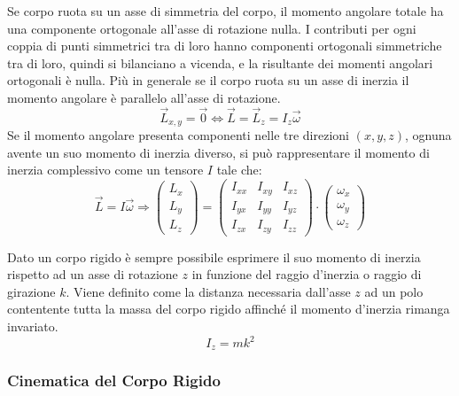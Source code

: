 \documentclass{article}
\numberwithin{equation}{subsection}
\begin{document}
Se corpo ruota su un asse di simmetria del corpo, il momento angolare totale ha una componente ortogonale all'asse di rotazione nulla. I contributi per ogni coppia di 
punti simmetrici tra di loro hanno componenti ortogonali simmetriche tra di loro, quindi si bilanciano a vicenda, e la risultante dei momenti angolari ortogonali è nulla. 
Più in generale se il corpo ruota su un asse di inerzia il momento angolare è parallelo all'asse di rotazione. 
\begin{equation}
    \vec{L}_{x,y}=\vec{0}\iff\vec{L}=\vec{L}_z=I_z\vec{\omega}
\end{equation}
Se il momento angolare presenta componenti 
nelle tre direzioni $(x,y,z)$, ognuna avente un suo momento 
di inerzia diverso, si può rappresentare il momento di inerzia 
complessivo come un tensore $I$ tale che:
\begin{equation*}
    \vec{L}=I\vec{\omega}\Rightarrow
    \begin{pmatrix}
        L_x\\
        L_y\\
        L_z
    \end{pmatrix}=
    \begin{pmatrix}
        I_{xx} & I_{xy} & I_{xz}\\
        I_{yx} & I_{yy} & I_{yz}\\
        I_{zx} & I_{zy} & I_{zz}
    \end{pmatrix}\cdot
    \begin{pmatrix}
        \omega_x\\
        \omega_y\\
        \omega_z
    \end{pmatrix}
\end{equation*}

Dato un corpo rigido è sempre possibile esprimere il suo momento di inerzia rispetto ad un asse di rotazione $z$ in funzione del raggio d'inerzia o raggio di girazione $k$. 
Viene definito come la distanza necessaria dall'asse $z$ ad un polo contentente tutta la massa del corpo rigido affinché il momento d'inerzia rimanga invariato. 
\begin{equation*}
    I_z=mk^2
\end{equation*}

\subsubsection{Cinematica del Corpo Rigido}
\end{document}
